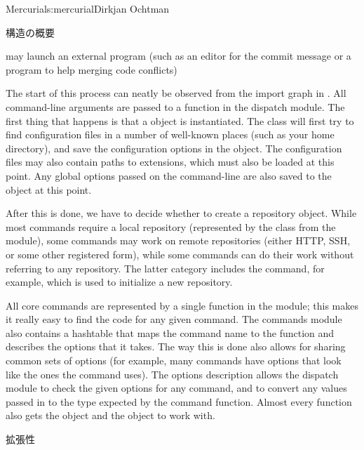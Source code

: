 \begin{aosachapter}{Mercurial}{s:mercurial}{Dirkjan Ochtman}
\begin{aosasect1}{構造の概要}
\begin{aosaitemize}
  \item {} may launch an external program (such as an editor for the
  commit message or a program to help merging code conflicts)

\end{aosaitemize}


The start of this process can neatly be observed from the import graph
in . All command-line arguments are
passed to a function in the dispatch module. The first thing that
happens is that a  object is instantiated. The 
class will first try to find configuration files in a number of
well-known places (such as your home directory), and save the
configuration options in the  object. The configuration files
may also contain paths to extensions, which must also be loaded at
this point. Any global options passed on the command-line are also
saved to the  object at this point.

After this is done, we have to decide whether to create a repository
object. While most commands require a local repository (represented
by the  class from the  module), some
commands may work on remote repositories (either HTTP, SSH, or some
other registered form), while some commands can do their work without
referring to any repository. The latter category includes the
 command, for example, which is used to initialize a new
repository.

All core commands are represented by a single function in the
 module; this makes it really easy to find the code for
any given command. The commands module also contains a hashtable that
maps the command name to the function and describes the options that
it takes. The way this is done also allows for sharing common sets of
options (for example, many commands have options that look like the
ones the  command uses). The options description allows the
dispatch module to check the given options for any command, and to
convert any values passed in to the type expected by the command
function. Almost every function also gets the  object and the
 object to work with.

\end{aosasect1}

\begin{aosasect1}{拡張性}


\end{aosasect1}
\end{aosachapter}
